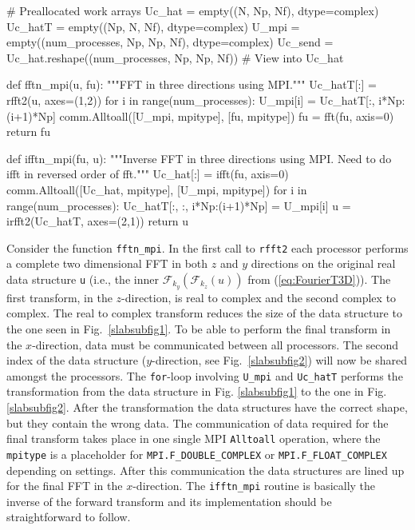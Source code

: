 \documentclass[11pt, oneside]{article}
\newcommand{\inpyth}{\lstinline[style=pythonstyle, basicstyle=\ttfamily]} %[]%
\begin{document}
\begin{python}
# Preallocated work arrays
Uc_hat  = empty((N, Np, Nf), dtype=complex) 
Uc_hatT = empty((Np, N, Nf), dtype=complex) 
U_mpi   = empty((num_processes, Np, Np, Nf), dtype=complex)
Uc_send = Uc_hat.reshape((num_processes, Np, Np, Nf)) # View into Uc_hat

def fftn_mpi(u, fu):
    """FFT in three directions using MPI."""
    Uc_hatT[:] = rfft2(u, axes=(1,2))
    for i in range(num_processes): 
        U_mpi[i] = Uc_hatT[:, i*Np:(i+1)*Np]
    comm.Alltoall([U_mpi, mpitype], [fu, mpitype])    
    fu = fft(fu, axis=0)
    return fu

def ifftn_mpi(fu, u):
    """Inverse FFT in three directions using MPI.
       Need to do ifft in reversed order of fft."""
    Uc_hat[:] = ifft(fu, axis=0)
    comm.Alltoall([Uc_hat, mpitype], [U_mpi, mpitype])
    for i in range(num_processes):
        Uc_hatT[:, :, i*Np:(i+1)*Np] = U_mpi[i]
    u = irfft2(Uc_hatT, axes=(2,1))
    return u
\end{python}
Consider the function \inpyth{fftn_mpi}. In the first call to \inpyth{rfft2} each processor performs a
complete two dimensional FFT in both $z$ and $y$ directions on the original real data structure \inpyth{u}
(i.e., the inner $\mathcal{F}_{k_y}(\mathcal{F}_{k_z}(u))$ from (\ref{eq:FourierT3D})). 
The first transform, in the $z$-direction, is real to complex and the second complex to complex. The real
to complex transform reduces the size of the data structure to the one seen in Fig.~\ref{slabsubfig1}. 
To be able to perform the final transform in the $x$-direction, data must be communicated between all
processors. The second index of the data structure ($y$-direction, see Fig.~\ref{slabsubfig2}) will now be 
shared amongst the processors. The \inpyth{for}-loop involving \inpyth{U_mpi} and \inpyth{Uc_hatT} performs 
the transformation from the data structure in Fig. \ref{slabsubfig1} to the one in Fig. \ref{slabsubfig2}. 
After the transformation the data structures have the correct shape, but they contain the wrong data. The 
communication of data required for the final transform takes place in one single MPI \inpyth{Alltoall} 
operation, where the \inpyth{mpitype} is a placeholder for \inpyth{MPI.F_DOUBLE_COMPLEX} or 
\inpyth{MPI.F_FLOAT_COMPLEX} depending on settings. After this communication the data structures are lined 
up for the final FFT in the $x$-direction. The \inpyth{ifftn_mpi} routine is basically the inverse of the 
forward transform and its implementation should be straightforward to follow.
\end{document}
